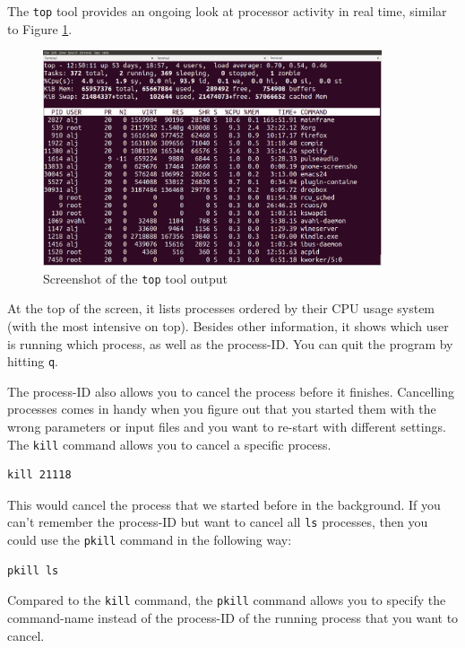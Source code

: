 \documentclass[11pt]{article}
\begin{document}
The \texttt{top} tool provides an ongoing look at processor activity in real
time, similar to Figure \ref{fig:orgparagraph5}.


\begin{figure}[htb]
\centering
\includegraphics[width=10cm]{top.png}
\caption{\label{fig:orgparagraph5}
Screenshot of the \texttt{top} tool output}
\end{figure}

At the top of the screen, it lists processes ordered by their CPU usage
system (with the most intensive on top). Besides other information, it shows which user is running
which process, as well as the process-ID. You can quit the program by
hitting \texttt{q}.

The process-ID also allows you to cancel the process before it
finishes. Cancelling processes comes in handy when you figure out
that you started them with the wrong parameters or input files and you want
to re-start with different settings. The \texttt{kill} command allows you
to cancel a specific process.

\begin{verbatim}
kill 21118
\end{verbatim}

This would cancel the process that we started before in the
background. If you can't remember the process-ID but want to cancel
all \texttt{ls} processes, then you could use the \texttt{pkill} command in the
following way:

\begin{verbatim}
pkill ls
\end{verbatim}

Compared to the \texttt{kill} command, the \texttt{pkill} command allows you to
specify the command-name instead of the process-ID of the running
process that you want to cancel.
\end{document}

